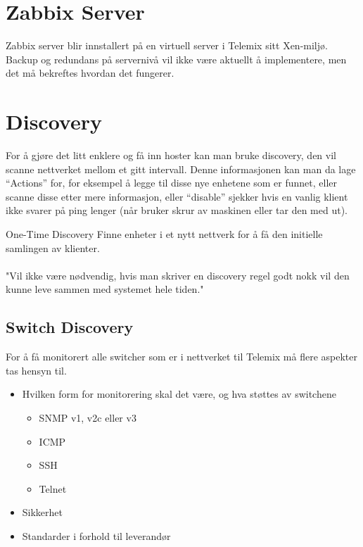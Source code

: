 \section{Zabbix Server}

Zabbix server blir innstallert på en virtuell server i Telemix sitt Xen-miljø. Backup og redundans på servernivå vil ikke være aktuellt å implementere, men det må bekreftes hvordan det fungerer.


\section{Discovery}
For å gjøre det litt enklere og få inn hoster kan man bruke discovery, den vil scanne nettverket mellom et gitt intervall. Denne informasjonen kan man da lage “Actions” for, for eksempel å legge til disse nye enhetene som er funnet, eller scanne disse etter mere informasjon, eller “disable” sjekker hvis en vanlig klient ikke svarer på ping lenger (når bruker skrur av maskinen eller tar den med ut).

\begin{tanke}{One-Time Discovery}
Finne enheter i et nytt nettverk for å få den initielle samlingen av klienter.
\\
\\
"Vil ikke være nødvendig, hvis man skriver en discovery regel godt nokk vil den kunne leve sammen med systemet hele tiden."
\end{tanke}

\subsection{Switch Discovery}
For å få monitorert alle switcher som er i nettverket til Telemix må flere aspekter tas hensyn til. 
\begin{itemize}
    \item Hvilken form for monitorering skal det være, og hva støttes av switchene 
        \begin{itemize}
            \item SNMP v1, v2c eller v3
            \item ICMP
            \item SSH
            \item Telnet
        \end{itemize}
    \item Sikkerhet
    \item Standarder i forhold til leverandør
\end{itemize}


